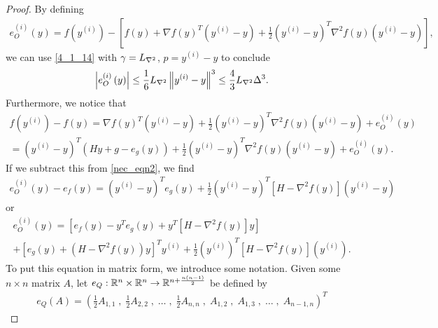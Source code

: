 \begin{proof}
By defining
\begin{align*}
e^{(i)}_O(y) = 
f\left(y^{(i)}\right) - \left[f(y) + \nabla f(y)^T \left(y^{(i)} - y\right) + \frac 1 2 \left(y^{(i)} - y\right)^T \nabla^2 f(y) \left(y^{(i)} - y\right)\right],
\end{align*}
we can use \cref{4_1_14} with $\gamma = {L_{\nabla^2}}$, $p = y^{(i)} - y$ to conclude
\begin{align}
\left|e^{(i)}_O\left(y\right) \right| \le \frac 1 6 {L_{\nabla^2}} \left\|y^{(i)} - y\right\|^3 \le \frac 4 3 {L_{\nabla^2}} \Delta^3 \label{nce_bound_rhs}.
\end{align}
Furthermore, we notice that
\begin{align*}
f\left(y^{(i)}\right) - f(y)
= \nabla f(y)^T \left(y^{(i)} - y\right) + \frac 1 2 \left(y^{(i)} - y\right)^T \nabla^2 f(y) \left(y^{(i)} - y\right) + e^{(i)}_O\left(y\right) \\
= \left(y^{(i)} - y\right)^T \left(Hy + g - e_g(y)\right) + \frac 1 2 \left(y^{(i)} - y\right)^T \nabla^2 f(y) \left(y^{(i)} - y\right) + e^{(i)}_O\left(y\right).
\end{align*}
If we subtract this from \cref{nec_eqn2}, we find
\begin{align*}
e^{(i)}_O\left(y\right) - e_f(y) = \left(y^{(i)} - y\right)^Te_g(y) +
\frac 1 2 \left(y^{(i)} - y\right)^T \left[H - \nabla^2 f(y)\right]\left(y^{(i)} - y\right)
\end{align*}
or
\begin{align}
e^{(i)}_O\left(y\right) = \left[e_f(y) - y^T e_g(y) + y^T \left[H - \nabla^2f(y)\right]y \right] \nonumber \\
+ \left[e_g(y) + \left(H - \nabla^2 f(y)\right)y\right]^T y^{(i)}
+ \frac 1 2 \left(y^{(i)}\right)^T \left[H - \nabla^2 f(y)\right]\left(y^{(i)}\right).
\label{nec_eqn1}
\end{align}
To put this equation in matrix form, we introduce some notation.
Given some $n \times n$ matrix $A$, let $e_Q : \mathbb R^n \times \mathbb R^n \to \mathbb R^{n + \frac {n(n-1)} 2}$
be defined by
\begin{align*}
e_Q\left(A\right) =
\left(\frac 1 2 A_{1, 1} \;,\; \frac 1 2 A_{2, 2} \;,\; \ldots \;,\; \frac 1 2 A_{n, n} \;,\; A_{1, 2} \;,\; A_{1, 3} \;,\; \ldots \;,\; A_{n-1, n} \right)^T

\end{align*}
\end{proof}

